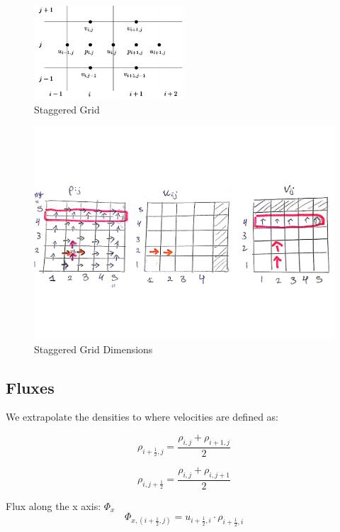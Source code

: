 \documentclass[a4paper,12pt]{article}
\begin{document}
\begin{figure}[H]
    \centering
    \includegraphics[width=0.5\textwidth]{img/staggered-grid.png}
    \caption{Staggered Grid}
\end{figure}

\begin{figure}[H]
    \centering
    \includegraphics[width=\textwidth]{img/staggered-grid2.pdf}
    \caption{Staggered Grid Dimensions}
\end{figure}

\subsection{Fluxes}


We extrapolate the densities to where velocities are defined as:

\[
    \rho_{i + \frac{1}{2}, j} = \frac{\rho_{i, j} +
    \rho_{i + 1, j}}{2}
\] 

\[
    \rho_{i, j + \frac{1}{2}} = \frac{\rho_{i, j} +
    \rho_{i, j + 1}}{2}
\] 

Flux along the x axis: \(\Phi_x\)
\[
    \Phi_{x, (i + \frac{1}{2}, j)} = u_{i + \frac{1}{2}, i} \cdot
    \rho_{i + \frac{1}{2}, i}
\] 
\end{document}
